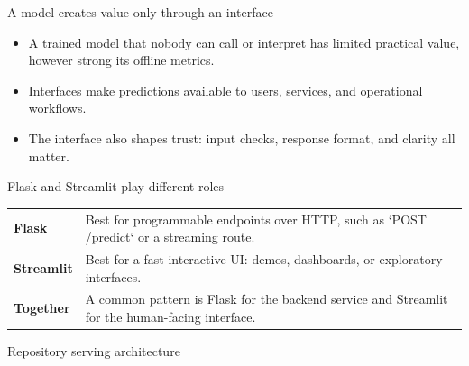 \begin{frame}{A model creates value only through an interface}
\begin{itemize}
\item A trained model that nobody can call or interpret has limited practical value, however strong its offline metrics.
\item Interfaces make predictions available to users, services, and operational workflows.
\item The interface also shapes trust: input checks, response format, and clarity all matter.
\end{itemize}
\coursefooter
\end{frame}

\begin{frame}{Flask and Streamlit play different roles}
\begin{tabularx}{\textwidth}{>{\bfseries}l X}
Flask & Best for programmable endpoints over HTTP, such as `POST /predict` or a streaming route. \\
Streamlit & Best for a fast interactive UI: demos, dashboards, or exploratory interfaces. \\
Together & A common pattern is Flask for the backend service and Streamlit for the human-facing interface. \\
\end{tabularx}
\coursefooter
\end{frame}

\begin{frame}{Repository serving architecture}
\centering
{}
\coursefooter
\end{frame}

